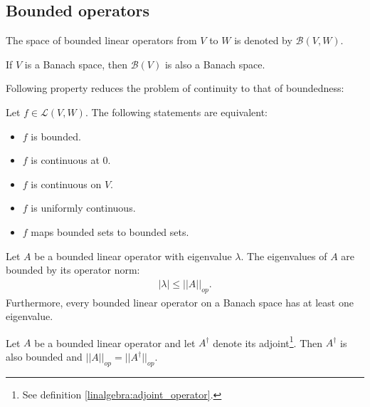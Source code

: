 
\subsection{Bounded operators}

    \begin{notation}
        The space of bounded linear operators from $V$ to $W$ is denoted by $\mathcal{B}(V, W)$.
    \end{notation}
    \begin{property}
        If $V$ is a Banach space, then $\mathcal{B}(V)$ is also a Banach space.
    \end{property}

    Following property reduces the problem of continuity to that of boundedness:
    \begin{property}\label{operator:bounded_continuous}
        Let $f\in\mathcal{L}(V, W)$. The following statements are equivalent:
        \begin{itemize}
            \item $f$ is bounded.
            \item $f$ is continuous at 0.
            \item $f$ is continuous on $V$.
            \item $f$ is uniformly continuous.
            \item $f$ maps bounded sets to bounded sets.
        \end{itemize}
    \end{property}

    \begin{property}
        Let $A$ be a bounded linear operator with eigenvalue $\lambda$. The eigenvalues of $A$ are bounded by its operator norm:
        \begin{gather}
            |\lambda|\leq||A||_{op}.
        \end{gather}
        Furthermore, every bounded linear operator on a Banach space has at least one eigenvalue.
    \end{property}
    \begin{property}
        Let $A$ be a bounded linear operator and let $A^\dag$ denote its adjoint\footnote{See definition \ref{linalgebra:adjoint_operator}.}. Then $A^\dag$ is also bounded and $||A||_{op} = ||A^\dag||_{op}$.
    \end{property}

